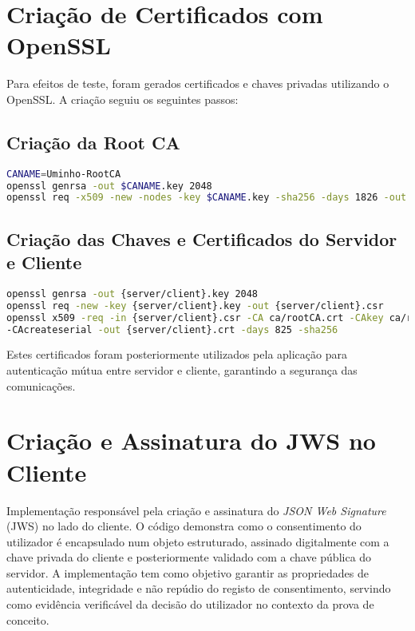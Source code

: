 \newpage

\section{Criação de Certificados com OpenSSL}
\label{ap:certificados}

Para efeitos de teste, foram gerados certificados e chaves privadas utilizando o OpenSSL. A criação seguiu os seguintes passos:

\subsection{Criação da Root CA}

\begin{lstlisting}[language=sh]
CANAME=Uminho-RootCA
openssl genrsa -out $CANAME.key 2048
openssl req -x509 -new -nodes -key $CANAME.key -sha256 -days 1826 -out $CANAME.crt
\end{lstlisting}

\subsection{Criação das Chaves e Certificados do Servidor e Cliente}

\begin{lstlisting}[language=sh]
openssl genrsa -out {server/client}.key 2048
openssl req -new -key {server/client}.key -out {server/client}.csr
openssl x509 -req -in {server/client}.csr -CA ca/rootCA.crt -CAkey ca/rootCA.key
-CAcreateserial -out {server/client}.crt -days 825 -sha256
\end{lstlisting}

Estes certificados foram posteriormente utilizados pela aplicação para autenticação mútua entre servidor e cliente, garantindo a segurança das comunicações.

\newpage

\section{Criação e Assinatura do JWS no Cliente}
\label{apendice:jws-client}
Implementação responsável pela criação e assinatura do \textit{JSON Web Signature} (JWS) no lado do cliente.
O código demonstra como o consentimento do utilizador é encapsulado num objeto estruturado, assinado digitalmente com a chave privada do cliente e posteriormente validado com a chave pública do servidor.
A implementação tem como objetivo garantir as propriedades de autenticidade, integridade e não repúdio do registo de consentimento, servindo como evidência verificável da decisão do utilizador no contexto da prova de conceito.

